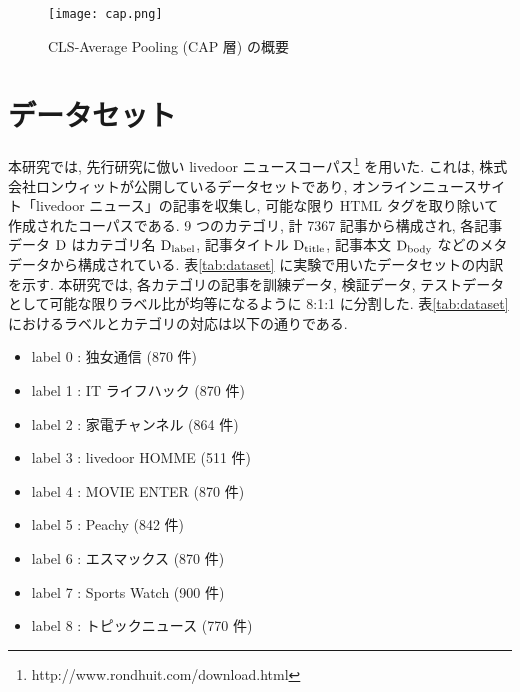 \documentclass[twocolumn]{jarticle}
\begin{document}
\begin{figure}[b]
  \begin{center}
    \texttt{[image: cap.png]}
    \caption{CLS-Average Pooling (CAP 層) の概要} %
    \label{fig:1_cap} %
  \end{center}
\end{figure}

\newpage

\section{データセット}
本研究では, 先行研究に倣い livedoor ニュースコーパス\footnote{ http://www.rondhuit.com/download.html} を用いた. これは, 株式会社ロンウィットが公開しているデータセットであり, オンラインニュースサイト「livedoor ニュース」の記事を収集し, 可能な限り HTML タグを取り除いて作成されたコーパスである. 9 つのカテゴリ, 計 7367 記事から構成され, 各記事データ $\rm{D}$ はカテゴリ名 $\rm{D_{\rm{label}}}$, 記事タイトル $\rm{D_{\rm{title}}}$, 記事本文 $\rm{D_{\rm{body}}}$ などのメタデータから構成されている. 表\ref{tab:dataset} に実験で用いたデータセットの内訳を示す. 本研究では, 各カテゴリの記事を訓練データ, 検証データ, テストデータとして可能な限りラベル比が均等になるように 8:1:1 に分割した. 表\ref{tab:dataset} におけるラベルとカテゴリの対応は以下の通りである.

\begin{itemize}
  \item label 0 : 独女通信 (870 件)
  \item label 1 : IT ライフハック (870 件)
  \item label 2 : 家電チャンネル (864 件)
  \item label 3 : livedoor HOMME (511 件)
  \item label 4 : MOVIE ENTER (870 件)
  \item label 5 : Peachy (842 件)
  \item label 6 : エスマックス (870 件)
  \item label 7 : Sports Watch (900 件)
  \item label 8 : トピックニュース (770 件)
\end{itemize}

\begin{table*}[t]
  \centering
  \caption{データセットの内訳 (livedoor ニュースコーパス)}
  \label{tab:dataset}%
\end{table*}%
\end{document}

